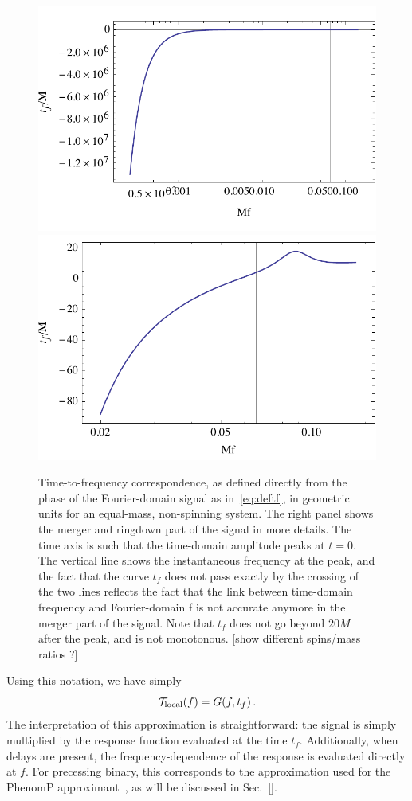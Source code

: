 \documentclass[aps,showpacs,%
prd,superscriptaddress,nofootinbib]{revtex4}
\newcommand{\be}{\begin{equation}}
\newcommand{\ee}{\end{equation}}
\newcommand\calT{{\mathcal{T}}}
\newcommand{\tf}{t_{f}}
\begin{document}
\begin{figure}
  \centering
  \includegraphics[width=.48\linewidth]{plots/tf.pdf}
  \hspace{0.2cm}
  \includegraphics[width=.48\linewidth]{plots/tfzoom.pdf}
  \caption{Time-to-frequency correspondence, as defined directly from the phase of the Fourier-domain signal as in~\eqref{eq:deftf}, in geometric units for an equal-mass, non-spinning system. The right panel shows the merger and ringdown part of the signal in more details. The time axis is such that the time-domain amplitude peaks at $t=0$. The vertical line shows the instantaneous frequency at the peak, and the fact that the curve $t_{f}$ does not pass exactly by the crossing of the two lines reflects the fact that the link between time-domain frequency and Fourier-domain f is not accurate anymore in the merger part of the signal. Note that $t_{f}$ does not go beyond $20M$ after the peak, and is not monotonous. [show different spins/mass ratios ?]}
  \label{fig:tf}
\end{figure}

Using this notation, we have simply
\be\label{eq:local}
	\calT_{\rm local}(f) = G(f, \tf) \,.
\ee
The interpretation of this approximation is straightforward: the signal is simply multiplied by the response function evaluated at the time $\tf$. Additionally, when delays are present, the frequency-dependence of the response is evaluated directly at $f$. For precessing binary, this corresponds to the approximation used for the PhenomP approximant~\cite{Hannam+13}, as will be discussed in Sec.~\ref{}.
\end{document}
